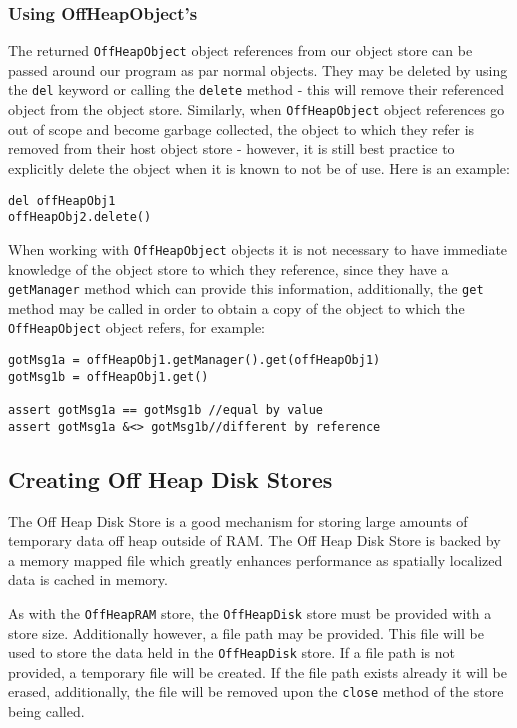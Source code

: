 \documentclass[conc-doc]{subfiles}
\begin{document}
\subsubsection{Using OffHeapObject's}
The returned \lstinline{OffHeapObject} object references from our object store can be passed around our program as par normal objects. They may be deleted by using the \lstinline{del} keyword or calling the \lstinline{delete} method - this will remove their referenced object from the object store. Similarly, when \lstinline{OffHeapObject} object references go out of scope and become garbage collected, the object to which they refer is removed from their host object store - however, it is still best practice to explicitly delete the object when it is known to not be of use. Here is an example:

\begin{lstlisting}
del offHeapObj1
offHeapObj2.delete()
\end{lstlisting}

When working with \lstinline{OffHeapObject} objects it is not necessary to have immediate knowledge of the object store to which they reference, since they have a \lstinline{getManager} method which can provide this information, additionally, the \lstinline{get} method may be called in order to obtain a copy of the object to which the \lstinline{OffHeapObject} object refers, for example:

\begin{lstlisting}
gotMsg1a = offHeapObj1.getManager().get(offHeapObj1)
gotMsg1b = offHeapObj1.get()

assert gotMsg1a == gotMsg1b //equal by value
assert gotMsg1a &<> gotMsg1b//different by reference
\end{lstlisting}

\subsection{Creating Off Heap Disk Stores}
The Off Heap Disk Store is a good mechanism for storing large amounts of temporary data off heap outside of RAM. The Off Heap Disk Store is backed by a memory mapped file which greatly enhances performance as spatially localized data is cached in memory.

As with the \lstinline{OffHeapRAM} store, the \lstinline{OffHeapDisk} store must be provided with a store size. Additionally however, a file path may be provided. This file will be used to store the data held in the \lstinline{OffHeapDisk} store. If a file path is not provided, a temporary file will be created. If the file path exists already it will be erased, additionally, the file will be removed upon the \lstinline{close} method of the store being called.
\end{document}
